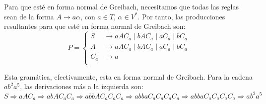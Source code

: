 \begin{ejercicio}
\begin{enumerate}
        Para que esté en forma normal de Greibach, necesitamos que todas las reglas sean de la forma $A\to a\alpha$, con $a\in T$, $\alpha\in V^*$. Por tanto, las producciones resultantes para que esté en forma normal de Greibach son:
        \begin{equation*}
            P = \left\{
                \begin{aligned}
                    S &\rightarrow aAC_a \mid bAC_a \mid aC_a \mid bC_a\\
                    A &\rightarrow aAC_a \mid bAC_a \mid aC_a \mid bC_a\\
                    C_a & \rightarrow a\\
                \end{aligned}
            \right.
        \end{equation*}

        Esta gramática, efectivamente, esta en forma normal de Greibach. Para la cadena $ab^2a^5$, las derivaciones más a la izquierda son:
        \begin{equation*}
            S \Rightarrow aAC_a \Rightarrow abAC_aC_a \Rightarrow abbAC_aC_aC_a \Rightarrow abbaC_aC_aC_aC_a \Rightarrow abbaC_aC_aC_aC_a \Rightarrow ab^2a^5
        \end{equation*}
    \end{enumerate}
\end{ejercicio}

